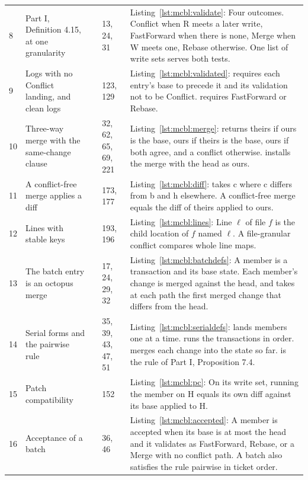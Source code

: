 \documentclass[11pt,letterpaper]{article}
\theoremstyle{definition}
\theoremstyle{remark}
\begin{document}
\begin{small}
\begin{longtable}{@{}L{0.8cm}L{3.4cm}L{3.6cm}L{1.3cm}L{5.4cm}@{}}
8 & Part I, Definition 4.15, at one granularity &  & 13, 24, 31 & Listing~\ref{lst:mcbl:validate}: Four outcomes. Conflict when R meets a later write, FastForward when there is none, Merge when W meets one, Rebase otherwise. One list of write sets serves both tests. \\
9 & Logs with no Conflict landing, and clean logs &  & 123, 129 & Listing~\ref{lst:mcbl:validated}:  requires each entry's base to precede it and its validation not to be Conflict.  requires FastForward or Rebase. \\
10 & Three-way merge with the same-change clause &  & 32, 62, 65, 69, 221 & Listing~\ref{lst:mcbl:merge}:  returns theirs if ours is the base, ours if theirs is the base, ours if both agree, and a conflict otherwise.  installs the merge with the head as ours. \\
11 & A conflict-free merge applies a diff &  & 173, 177 & Listing~\ref{lst:mcbl:diff}:  takes c where c differs from b and h elsewhere. A conflict-free merge equals the diff of theirs applied to ours. \\
12 & Lines with stable keys &  & 193, 196 & Listing~\ref{lst:mcbl:lines}: Line $\ell$ of file $f$ is the child location of $f$ named $\ell$. A file-granular conflict compares whole line maps. \\
13 & The batch entry is an octopus merge &  & 17, 24, 29, 32 & Listing~\ref{lst:mcbl:batchdefs}: A member is a transaction and its base state. Each member's change is merged against the head, and  takes at each path the first merged change that differs from the head. \\
14 & Serial forms and the pairwise rule &  & 35, 39, 43, 47, 51 & Listing~\ref{lst:mcbl:serialdefs}:  lands members one at a time.  runs the transactions in order.  merges each change into the state so far.  is the rule of Part I, Proposition 7.4. \\
15 & Patch compatibility &  & 152 & Listing~\ref{lst:mcbl:pc}: On its write set, running the member on H equals its own diff against its base applied to H. \\
16 & Acceptance of a batch &  & 36, 46 & Listing~\ref{lst:mcbl:accepted}: A member is accepted when its base is at most the head and it validates as FastForward, Rebase, or a Merge with no conflict path. A batch also satisfies the rule pairwise in ticket order. \\

\end{longtable}
\end{small}
\end{document}
